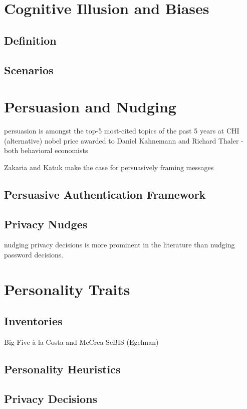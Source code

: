 \section{Cognitive Illusion and Biases}
	\subsection{Definition}
	\subsection{Scenarios}
	
\section{Persuasion and Nudging}

persuasion is amongst the top-5 most-cited topics of the past 5 years at CHI
(alternative) nobel price awarded to Daniel Kahnemann and Richard Thaler - both behavioral economists

\cite{Zakaria2013DesigningEffectiveSecurityMessages} Zakaria and Katuk make the case for persuasively framing messages

	\subsection{Persuasive Authentication Framework}
	\subsection{Privacy Nudges}
	nudging privacy decisions is more prominent in the literature than nudging password decisions. 

\section{Personality Traits}
	\subsection{Inventories}
	Big Five à la Costa and McCrea \cite{Costa1992NEO}
	SeBIS (Egelman)
	\subsection{Personality Heuristics}	
	\subsection{Privacy Decisions}
